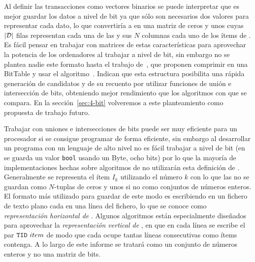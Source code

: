Al definir las transacciones como vectores binarios se puede interpretar que es mejor guardar los datos a nivel de bit ya que sólo son necesarios dos valores para representar cada dato, lo que convertiría a \D en una matriz de ceros y unos cuyas $|\D|$ filas representan cada una de las \transacciones y sus $N$ columnas cada uno de los ítems de \I. Es fácil pensar en trabajar con matrices de estas características para aprovechar la potencia de los ordenadores al trabajar a nivel de bit, sin embargo no se plantea nadie este formato hasta el trabajo de~\citet{DongHan-BitTableFIEfficientFIMalg-2007}, que proponen comprimir \D en una {BitTable} y usar el algoritmo~. Indican que esta estructura posibilita una rápida generación de candidatos y de su recuento por utilizar funciones de unión e intersección de bits, obteniendo mejor rendimiento que los algoritmos con que se compara. En la sección~\ref{sec:4-bit} volveremos a este planteamiento como propuesta de trabajo futuro.

Trabajar con uniones e intersecciones de bits puede ser muy eficiente para un procesador si se consigue programar de forma eficiente, sin embargo al desarrollar un programa con un lenguaje de alto nivel no es fácil trabajar a nivel de bit (en \langCpp se guarda un valor \texttt{bool} usando un Byte, ocho bits) por lo que la mayoría de implementaciones hechas sobre algoritmos de \arm no utilizarán esta definición de \I. Generalmente se representa el ítem $I_k$ utilizando el número $k$ con lo que las \transacciones no se guardan como $N$-tuplas de ceros y unos si no como conjuntos de números enteros. El formato más utilizado para guardar \D de este modo es escribiendo en un fichero de texto plano cada \transaccion en una línea del fichero, lo que se conoce como \emph{representación horizontal de \D}. Algunos algoritmos están especialmente diseñados para aprovechar la \emph{representación vertical de \D}, en que en cada línea se escribe el par $\TID\ item$ de modo que cada \transaccion ocupe tantas líneas consecutivas como ítems contenga. A lo largo de este informe se tratará \D como un conjunto de números enteros y no una matriz de bits.
